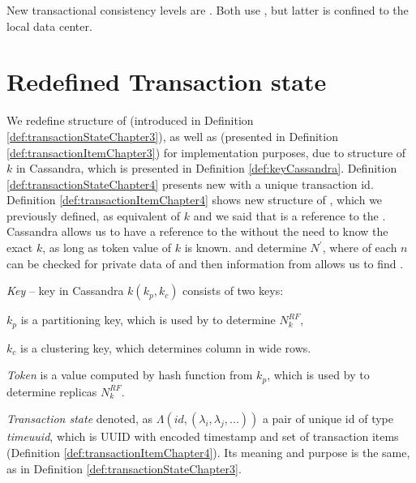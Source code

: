 New transactional consistency levels are . Both use \mpt, but latter is confined to the local data center.

\section{Redefined Transaction state}
We redefine structure of \txState (introduced in Definition \ref{def:transactionStateChapter3}), as well as \txItems (presented in Definition \ref{def:transactionItemChapter3}) for implementation purposes, due to structure of $k$ in Cassandra, which is presented in Definition \ref{def:keyCassandra}. Definition \ref{def:transactionStateChapter4} presents new \txState with a unique transaction id. Definition \ref{def:transactionItemChapter4} shows new structure of \txItem, which we previously defined, as equivalent of $k$ and we said that \txItem is a reference to the . Cassandra allows us to have a reference to the  without the need to know the exact $k$, as long as token value of $k$ is known. \txItem and \topology determine $N^'$, where \txStorage of each $n$ can be checked for private data of \transaction and then information from \txItem allows us to find .


\begin{definition}
\label{def:keyCassandra}
\emph{Key} -- key in Cassandra $k(k_p,k_c)$ consists of two keys: 
\begin{enumerate*} 
\item $k_p$ is a partitioning key, which is used by \topology to determine $\mathit{N}^{RF}_k$,
\item $k_c$ is a clustering key, which determines column in wide rows.
\end{enumerate*}
\end{definition}

\begin{definition}
\label{def:tokenChapter4}
\emph{Token} is a value computed by hash function from $k_p$, which is used by \topology to determine replicas $\mathit{N}^{RF}_k$.
\end{definition}


\begin{definition}
\label{def:transactionStateChapter4}
\emph{Transaction state} denoted, as $\Lambda(\mathit{id}, (\lambda_{i}, \lambda_{j}, ...))$ a pair of unique id of type \emph{timeuuid}, which is UUID with encoded timestamp \cite{CassandraUUID} and set of transaction items (Definition \ref{def:transactionItemChapter4}). Its meaning and purpose is the same, as in Definition \ref{def:transactionStateChapter3}.
\end{definition}

